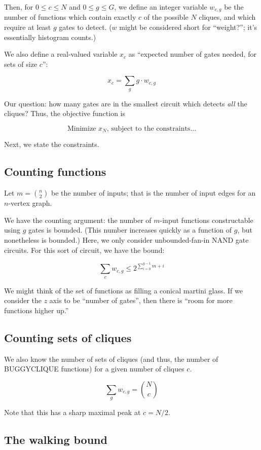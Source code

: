 \documentclass[12pt]{article}
\theoremstyle{definition}
\begin{document}
Then, for $0 \le c \le N$ and $0 \le g \le G$,
we define an integer variable $w_{c,g}$ be the number of functions which contain
exactly $c$ of the possible $N$ cliques, and which require at least
$g$ gates to detect. ($w$ might be considered short for ``weight?'';
it's essentially histogram counts.)

We also define a real-valued variable
$x_c$ as ``expected number of gates needed, for sets of size $c$'':

\[
x_c = \sum_g g \cdot w_{c,g}
\]

Our question: how many gates are in the smallest circuit
which detects {\em all} the cliques? Thus, the objective function
is

\[
\text{Minimize }x_N\text{, subject to the constraints...}
\]

Next, we state the constraints.

\subsection{Counting functions}

Let $m = {n \choose 2}$ be the number of inputs; that is the number
of input edges for an $n$-vertex graph.

We have the counting argument: the number of $m$-input functions
constructable using $g$ gates is bounded. (This number increases
quickly as a function of $g$, but nonetheless is bounded.)
Here, we only consider unbounded-fan-in NAND gate circuits. For
this sort of circuit, we have the bound:

\[
\sum_c w_{c,g} \le 2^{\sum_{i=0}^{g-1} m+i}
\]

We might think of the set of functions as filling a conical
martini glass. If we consider the $z$ axis to be ``number of gates'',
then there is ``room for more functions higher up.''

\subsection{Counting sets of cliques}

We also know the number of sets of cliques (and thus, the number
of BUGGYCLIQUE functions) for a given number of cliques $c$.

\[
\sum_g w_{c,g} = {N \choose c}
\]

Note that this has a sharp maximal peak at $c = N/2$.

\subsection{The walking bound}
\end{document}
